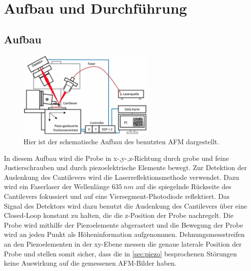 \newpage
\section{Aufbau und Durchführung}
\subsection{Aufbau}
\label{sec:Aufbau}
    \begin{figure}[ht]
        \centering\captionsetup{format=plain}
        \includegraphics[width=0.6\textwidth]{bilder/Aufbau.png}
        \caption{Hier ist der schematische Aufbau des benutzten AFM dargestellt. \cite{anleitung}}
        \label{fig:Aufbau}
    \end{figure}
    \FloatBarrier
    In diesem Aufbau wird die Probe in x-,y-,z-Richtung durch grobe und feine Justierschrauben und durch piezoelektrische Elemente bewegt.
    Zur Detektion der Auslenkung des Cantilevers wird die Laserreflektionsmethode verwendet.
    Dazu wird ein Faserlaser der Wellenlänge $\SI{635}{nm}$ auf die spiegelnde Rückseite des Cantilevers fokussiert und auf eine Viersegment-Photodiode reflektiert.
    Das Signal des Detektors wird dazu benutzt die Auslenkung des Cantilevers über eine Closed-Loop konstant zu halten, die die z-Position der Probe nachregelt.
    Die Probe wird mithilfe der Piezoelemente abgerastert und die Bewegung der Probe wird an jeden Punkt als Höheninformation aufgenommen.
    Dehnungsmessstreifen an den Piezoelementen in der xy-Ebene messen die genaue laterale Position der Probe und stellen somit sicher, dass die in \autoref{sec:piezo} besprochenen Störungen keine Auswirkung auf die gemessenen AFM-Bilder haben.

